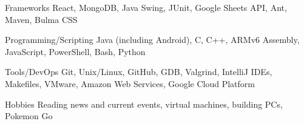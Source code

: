 

\begin{cvskills}

  \cvskill
    {Frameworks} %
    {React, MongoDB, Java Swing, JUnit, Google Sheets API, Ant, Maven, Bulma CSS} %

  \cvskill
    {Programming/Scripting} %
    {Java (including Android), C, C++, ARMv6 Assembly, JavaScript, PowerShell, Bash, Python} %
    
  \cvskill
    {Tools/DevOps} %
    {Git, Unix/Linux, GitHub, GDB, Valgrind, IntelliJ IDEs, Makefiles, VMware, Amazon Web Services, Google Cloud Platform} %

  \cvskill
  {Hobbies} %
  {Reading news and current events, virtual machines, building PCs, Pokemon Go} %

\end{cvskills}
